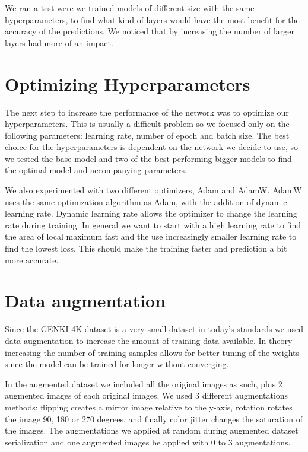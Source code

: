 \documentclass[12pt,a4paper,english
]{tunithesis}
\begin{document}
We ran a test were we trained models of different size with the same hyperparameters, to find what kind of layers would have the most benefit for the accuracy of the predictions. We noticed that by increasing the number of larger layers had more of an impact.

\section{Optimizing Hyperparameters}
The next step to increase the performance of the network was to optimize our hyperparameters. This is usually a difficult problem so we focused only on the following parameters: learning rate, number of epoch and batch size. The best choice for the hyperparameters is dependent on the network we decide to use, so we tested the base model and two of the best performing bigger models to find the optimal model and accompanying parameters.

We also experimented with two different optimizers, Adam and AdamW. AdamW uses the same optimization algorithm as Adam, with the addition of dynamic learning rate. Dynamic learning rate allows the optimizer to change the learning rate during training. In general we want to start with a high learning rate to find the area of local maximum fast and the use increasingly smaller learning rate to find the lowest loss. This should make the training faster and prediction a bit more accurate.~\cite{adamw}

\section{Data augmentation}
\label{sec:dataaug}
Since the GENKI-4K dataset is a very small dataset in today's standards we used data augmentation to increase the amount of training data available. In theory increasing the number of training samples allows for better tuning of the weights since the model can be trained for longer without converging.\cite{dlbook}

In the augmented dataset we included all the original images as such, plus 2 augmented images of each original images. We used 3 different augmentations methods: flipping creates a mirror image relative to the y-axis, rotation rotates the image 90, 180 or 270 degrees, and finally color jitter changes the saturation of the images. The augmentations we applied at random during augmented dataset serialization and one augmented images be applied with 0 to 3 augmentations.
\end{document}

